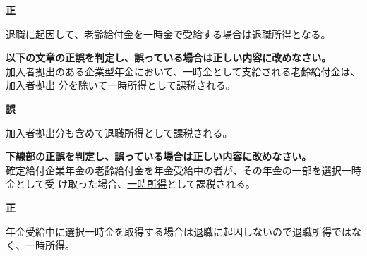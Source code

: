 \begin{answerbox}
  \textbf{正}
\end{answerbox}

\begin{explanationbox}
  退職に起因して、老齢給付金を一時金で受給する場合は退職所得となる。
\end{explanationbox}

\begin{truefalse}[年金1 2019 問題2(1)\textcircled{1}]
         \textbf{以下の文章の正誤を判定し、誤っている場合は正しい内容に改めなさい。}
\\  


加入者拠出のある企業型年金において、一時金として支給される老齢給付金は、加入者拠出
分を除いて一時所得として課税される。
\end{truefalse}

\begin{answerbox}
  \textbf{誤}

  加入者拠出分も含めて退職所得として課税される。
\end{answerbox}

\begin{truefalse}[年金1 H29 問題1(6)\textcircled{4}]
         \textbf{下線部の正誤を判定し、誤っている場合は正しい内容に改めなさい。}
\\  

確定給付企業年金の老齢給付金を年金受給中の者が、その年金の一部を選択一時金として受
け取った場合、\underline{一時所得}として課税される。
\end{truefalse}

\begin{answerbox}
  \textbf{正}
\end{answerbox}

\begin{explanationbox}
  年金受給中に選択一時金を取得する場合は退職に起因しないので退職所得ではなく、一時所得。
\end{explanationbox}

\newpage